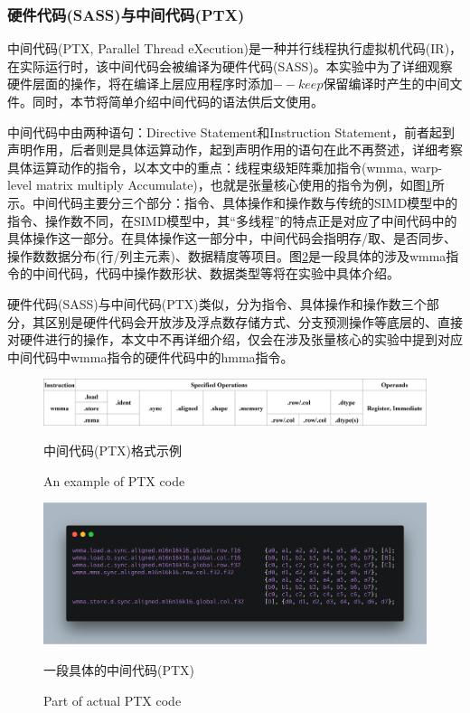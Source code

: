 \subsubsection{硬件代码(SASS)与中间代码(PTX)}
\par 中间代码(PTX, Parallel Thread eXecution)\cite{PTX}是一种并行线程执行虚拟机代码(IR)，在实际运行时，该中间代码会被编译为硬件代码(SASS)。本实验中为了详细观察硬件层面的操作，将在编译上层应用程序时添加$ --keep $保留编译时产生的中间文件。同时，本节将简单介绍中间代码的语法供后文使用。
\par 中间代码中由两种语句：Directive Statement和Instruction Statement，前者起到声明作用，后者则是具体运算动作，起到声明作用的语句在此不再赘述，详细考察具体运算动作的指令，以本文中的重点：线程束级矩阵乘加指令(wmma, warp-level matrix multiply Accumulate)，也就是张量核心使用的指令为例，如图\ref{Fig.Inst}所示。中间代码主要分三个部分：指令、具体操作和操作数与传统的SIMD模型中的指令、操作数不同，在SIMD模型中，其“多线程”的特点正是对应了中间代码中的具体操作这一部分。在具体操作这一部分中，中间代码会指明存/取、是否同步、操作数数据分布(行/列主元素)、数据精度等项目。图\ref{Fig.ActualInst}是一段具体的涉及wmma指令的中间代码，代码中操作数形状、数据类型等将在实验中具体介绍。
\par 硬件代码(SASS)与中间代码(PTX)类似，分为指令、具体操作和操作数三个部分，其区别是硬件代码会开放涉及浮点数存储方式、分支预测操作等底层的、直接对硬件进行的操作，本文中不再详细介绍，仅会在涉及张量核心的实验中提到对应中间代码中wmma指令的硬件代码中的hmma指令。
\begin{figure}
	\centering
	\includegraphics[width=15cm]{figures/Inst.jpg}
	\renewcommand{\thefigure}{\arabic{section}-\arabic{figure} }
	\renewcommand{\figurename}{图}
	\caption{中间代码(PTX)格式示例} 
	\addtocounter{figure}{-1}
	\renewcommand{\thefigure}{\arabic{section}-\arabic{figure} }
	\renewcommand{\figurename}{Figure}
	\caption{An example of PTX code}
	\label{Fig.Inst}
\end{figure}
\begin{figure}
	\centering
	\includegraphics[width=15cm]{figures/ActualInst.jpg}
	\renewcommand{\thefigure}{\arabic{section}-\arabic{figure} }
	\renewcommand{\figurename}{图}
	\caption{一段具体的中间代码(PTX)}
	\addtocounter{figure}{-1}
	\renewcommand{\thefigure}{\arabic{section}-\arabic{figure} }
	\renewcommand{\figurename}{Figure}
	\caption{Part of actual PTX code}
	\label{Fig.ActualInst}
\end{figure}
